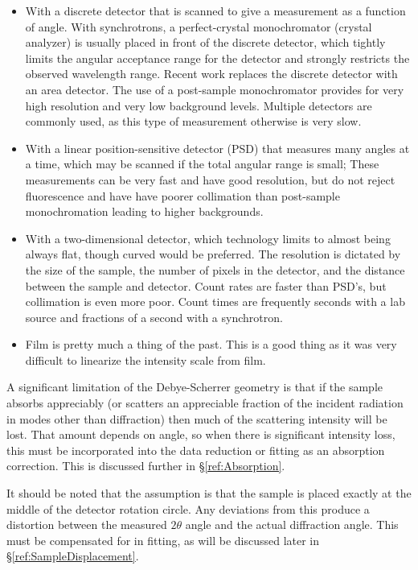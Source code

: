 \begin{itemize}
    \item 
With a discrete detector that is scanned to give a measurement as a function of angle. With synchrotrons, 
a perfect-crystal monochromator (crystal analyzer) is usually placed in front of the discrete detector, which tightly limits the angular acceptance range for the detector and strongly restricts the observed wavelength range. Recent work replaces the discrete detector with an area detector. The use of a post-sample monochromator provides for very high resolution and very low background levels. Multiple detectors are commonly used, as this type of measurement otherwise is very slow. 
\item
With a linear position-sensitive detector (PSD) that measures many angles at a time, which may be scanned if the total angular range is small; These measurements can be very fast and have good resolution, but do not reject fluorescence and have have poorer collimation than post-sample monochromation leading to higher backgrounds. 
\item 
With a two-dimensional detector, which technology limits to almost being always flat, though curved would be preferred. The resolution is dictated by the size of the sample, the number of pixels in the detector, and the distance between the sample and detector. Count rates are faster than PSD's, but collimation is even more poor. Count times are frequently seconds with a lab source and fractions of a second with a synchrotron. 
\item
Film is pretty much a thing of the past. This is a good thing as it was very difficult to linearize the intensity scale from film. 
\end{itemize}

A significant limitation of the Debye-Scherrer geometry is that if the sample absorbs appreciably (or scatters an appreciable fraction of the incident radiation in modes other than diffraction) then much of the scattering intensity will be lost. That amount depends on angle, so when there is significant intensity loss, this must be incorporated into the data reduction or fitting as an absorption correction. This is discussed further in \S\ref{ref:Absorption}.

It should be noted that the assumption is that the sample is placed exactly at the middle of the detector rotation circle. Any deviations from this produce a distortion between the measured $2\theta$ angle and the actual diffraction angle. This must be compensated for in fitting, as will be discussed later in \S\ref{ref:SampleDisplacement}.

